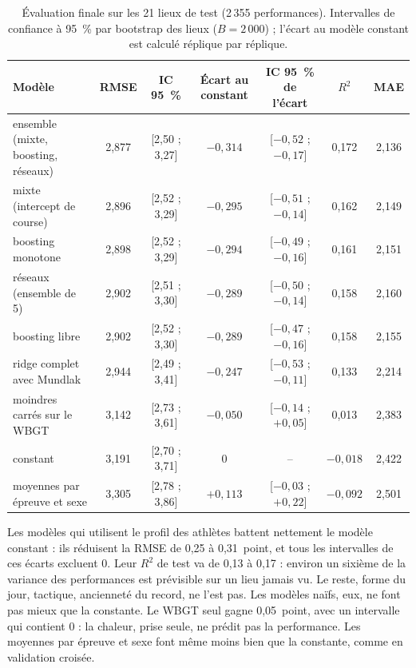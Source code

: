 \documentclass[11pt,a4paper]{article}
\begin{document}
\begin{table}[htbp]
\centering
\small
\caption{Évaluation finale sur les 21 lieux de test (2\,355 performances). Intervalles de confiance à 95~\% par
bootstrap des lieux ($B = 2\,000$) ; l'écart au modèle constant est calculé réplique par réplique.}
\label{tab:test}
\begin{tabular}{@{}lcccccc@{}}
\toprule
Modèle & RMSE & IC 95~\% & Écart au constant & IC 95~\% de l'écart & $R^2$ & MAE \\
\midrule
ensemble (mixte, boosting, réseaux) & 2,877 & [2,50 ; 3,27] & $-0{,}314$ & [$-0{,}52$ ; $-0{,}17$] & 0,172 & 2,136 \\
mixte (intercept de course) & 2,896 & [2,52 ; 3,29] & $-0{,}295$ & [$-0{,}51$ ; $-0{,}14$] & 0,162 & 2,149 \\
boosting monotone & 2,898 & [2,52 ; 3,29] & $-0{,}294$ & [$-0{,}49$ ; $-0{,}16$] & 0,161 & 2,151 \\
réseaux (ensemble de 5) & 2,902 & [2,51 ; 3,30] & $-0{,}289$ & [$-0{,}50$ ; $-0{,}14$] & 0,158 & 2,160 \\
boosting libre & 2,902 & [2,52 ; 3,30] & $-0{,}289$ & [$-0{,}47$ ; $-0{,}16$] & 0,158 & 2,155 \\
ridge complet avec Mundlak & 2,944 & [2,49 ; 3,41] & $-0{,}247$ & [$-0{,}53$ ; $-0{,}11$] & 0,133 & 2,214 \\
moindres carrés sur le WBGT & 3,142 & [2,73 ; 3,61] & $-0{,}050$ & [$-0{,}14$ ; $+0{,}05$] & 0,013 & 2,383 \\
constant & 3,191 & [2,70 ; 3,71] & 0 & -- & $-0{,}018$ & 2,422 \\
moyennes par épreuve et sexe & 3,305 & [2,78 ; 3,86] & $+0{,}113$ & [$-0{,}03$ ; $+0{,}22$] & $-0{,}092$ & 2,501 \\
\bottomrule
\end{tabular}
\end{table}

Les modèles qui utilisent le profil des athlètes battent nettement le modèle constant : ils réduisent la RMSE de 0,25 à
0,31~point, et tous les intervalles de ces écarts excluent 0. Leur $R^2$ de test va de 0,13 à 0,17 : environ un
sixième de la variance des performances est prévisible sur un lieu jamais vu. Le reste, forme du jour, tactique,
ancienneté du record, ne l'est pas. Les modèles naïfs, eux, ne font pas mieux que la constante. Le WBGT seul gagne
0,05~point, avec un intervalle qui contient 0 : la chaleur, prise seule, ne prédit pas la performance. Les moyennes par
épreuve et sexe font même moins bien que la constante, comme en validation croisée.
\end{document}
